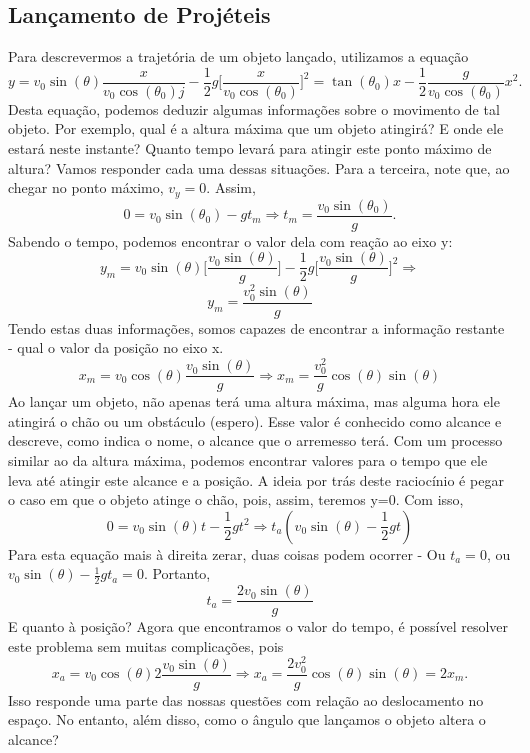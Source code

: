 \documentclass{article}
\begin{document}
\subsection{Lançamento de Projéteis}
  Para descrevermos a trajetória de um objeto lançado, utilizamos a equação 
    $$
    y = v_{0}\sin{(\theta )}\frac{x}{v_{0}\cos{(\theta _0)}j} - \frac{1}{2}g\biggl[\frac{x}{v_{0}\cos{(\theta _0)}}\biggr]^{2} = \tan{(\theta _{0})}x-\frac{1}{2}\frac{g}{v_{0}\cos{(\theta _{0})}}x^{2}.
    $$
  Desta equação, podemos deduzir algumas informações sobre o movimento de tal objeto. Por exemplo, qual é a altura máxima
  que um objeto atingirá? E onde ele estará neste instante? Quanto tempo levará para atingir este ponto máximo de altura?  
  Vamos responder cada uma dessas situações. Para a terceira, note que, ao chegar no ponto máximo, $v_{y}=0.$ Assim, 
    $$
    0 = v_{0}\sin{(\theta_{0})}-gt_{m} \Rightarrow \boxed{t_{m} = \frac{v_{0}\sin{(\theta_{0})}}{g}.}
    $$
    Sabendo o tempo, podemos encontrar o valor dela com reação ao eixo y: 
      $$
      y_{m} = v_{0}\sin{(\theta )}\biggl[\frac{v_{0}\sin{(\theta )}}{g}\biggr] - \frac{1}{2}g\biggl[\frac{v_{0}\sin{(\theta )}}{g}\biggr]^{2} \Rightarrow 
      $$
      $$
      \boxed{y_{m}=\frac{v_{0}^{2}\sin{(\theta )}}{g}}
      $$
    Tendo estas duas informações, somos capazes de encontrar a informação restante - qual o valor da posição no eixo x. 
      $$
      x_{m} = v_{0}\cos{(\theta )}\frac{v_{0}\sin{(\theta )}}{g} \Rightarrow \boxed{x_{m} = \frac{v_{0}^{2}}{g}\cos{(\theta )}\sin{(\theta )}}
      $$
    Ao lançar um objeto, não apenas terá uma altura máxima, mas alguma hora ele atingirá o chão ou um obstáculo (espero). Esse valor é
    conhecido como alcance e descreve, como indica o nome, o alcance que o arremesso terá. Com um processo similar ao da
    altura máxima, podemos encontrar valores para o tempo que ele leva até atingir este alcance e a posição. A ideia por trás deste
    raciocínio é pegar o caso em que o objeto atinge o chão, pois, assim, teremos y=0. Com isso, 
      $$
        0 = v_{0}\sin{(\theta )}t - \frac{1}{2}gt^{2} \Rightarrow t_{a}(v_{0}\sin{(\theta )}-\frac{1}{2}gt)
      $$
    Para esta equação mais à direita zerar, duas coisas podem ocorrer - Ou $t_{a} = 0$, ou $v_{0}\sin{(\theta )} - \frac{1}{2}gt_{a}=0.$
    Portanto, 
      $$
      \boxed{t_{a} = \frac{2v_{0}\sin{(\theta )}}{g}}
      $$
    E quanto à posição? Agora que encontramos o valor do tempo, é possível resolver este problema sem muitas complicações, pois 
      $$
        x_{a} = v_{0}\cos{(\theta )}2\frac{v_{0}\sin{(\theta )}}{g} \Rightarrow x_{a} = \frac{2v_{0}^{2}}{g}\cos{(\theta )}\sin{(\theta )} = 2x_{m}.
      $$
    Isso responde uma parte das nossas questões com relação ao deslocamento no espaço. No entanto, além disso, como o ângulo que
    lançamos o objeto altera o alcance? 
\end{document}
